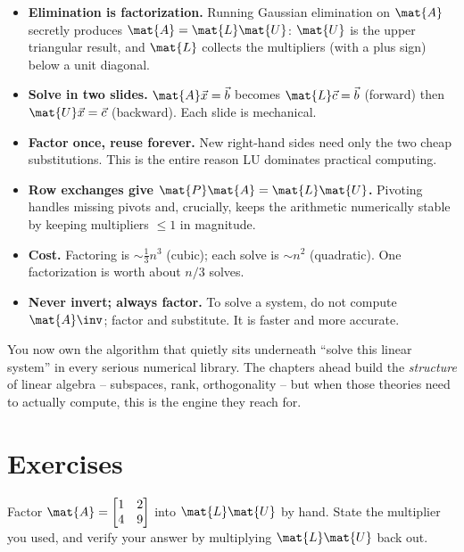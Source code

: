 \begin{itemize}
  \item \textbf{Elimination is factorization.} Running Gaussian elimination on $\mat{A}$
        secretly produces $\mat{A}=\mat{L}\mat{U}$: $\mat{U}$ is the upper triangular result,
        and $\mat{L}$ collects the multipliers (with a plus sign) below a unit diagonal.
  \item \textbf{Solve in two slides.} $\mat{A}\vec{x}=\vec{b}$ becomes $\mat{L}\vec{c}=\vec{b}$
        (forward) then $\mat{U}\vec{x}=\vec{c}$ (backward). Each slide is mechanical.
  \item \textbf{Factor once, reuse forever.} New right-hand sides need only the two cheap
        substitutions. This is the entire reason LU dominates practical computing.
  \item \textbf{Row exchanges give $\mat{P}\mat{A}=\mat{L}\mat{U}$.} Pivoting handles missing
        pivots and, crucially, keeps the arithmetic numerically stable by keeping multipliers
        $\le 1$ in magnitude.
  \item \textbf{Cost.} Factoring is $\sim\tfrac13 n^3$ (cubic); each solve is $\sim n^2$
        (quadratic). One factorization is worth about $n/3$ solves.
  \item \textbf{Never invert; always factor.} To solve a system, do not compute $\mat{A}\inv$;
        factor and substitute. It is faster and more accurate.
\end{itemize}

You now own the algorithm that quietly sits underneath ``solve this linear system'' in every
serious numerical library. The chapters ahead build the \emph{structure} of linear algebra --
subspaces, rank, orthogonality -- but when those theories need to actually compute, this is
the engine they reach for.

\section{Exercises}
\label{ch09:exercises}

\begin{exercise}
\label{ch09:ex-warmup}
Factor $\mat{A}=\begin{bmatrix} 1 & 2 \\ 4 & 9 \end{bmatrix}$ into $\mat{L}\mat{U}$ by hand.
State the multiplier you used, and verify your answer by multiplying $\mat{L}\mat{U}$ back
out.
\end{exercise}

